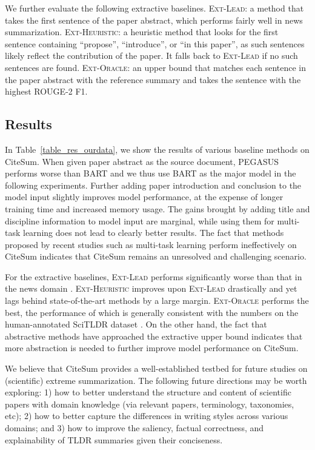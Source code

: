 \documentclass[11pt]{article}
\newcommand{\ourdata}{CiteSum\xspace}
\begin{document}
We further evaluate the following extractive baselines.
\textsc{Ext-Lead}: a method that takes the first sentence of the paper abstract, which performs fairly well in news summarization.
\textsc{Ext-Heuristic}: a heuristic method that looks for the first sentence containing ``propose'', ``introduce'', or ``in this paper'', as such sentences likely reflect the contribution of the paper. It falls back to \textsc{Ext-Lead} if no such sentences are found.
\textsc{Ext-Oracle}: an upper bound that matches each sentence in the paper abstract with the reference summary and takes the sentence with the highest ROUGE-2 F1.

\subsection{Results}
In Table~\ref{table_res_ourdata}, we show the results of various baseline methods on \ourdata.
When given paper abstract as the source document, PEGASUS performs worse than BART and we thus use BART as the major model in the following experiments.
Further adding paper introduction and conclusion to the model input slightly improves model performance, at the expense of longer training time and increased memory usage.
The gains brought by adding title and discipline information to model input are marginal, while using them for multi-task learning does not lead to clearly better results. The fact that methods proposed by recent studies such as multi-task learning \cite{cachola-etal-2020-tldr} perform ineffectively on \ourdata indicates that \ourdata remains an unresolved and challenging scenario. 

For the extractive baselines, \textsc{Ext-Lead} performs significantly worse than that in the news domain \cite{mao-etal-2020-facet}. \textsc{Ext-Heuristic} improves upon \textsc{Ext-Lead} drastically and yet lags behind state-of-the-art methods by a large margin.
\textsc{Ext-Oracle} performs the best, the performance of which is generally consistent with the numbers on the human-annotated SciTLDR dataset \cite{cachola-etal-2020-tldr}.
On the other hand, the fact that abstractive methods have approached the extractive upper bound indicates that more abstraction is needed to further improve model performance on \ourdata. 

We believe that \ourdata provides a well-established testbed for future studies on (scientific) extreme summarization.
The following future directions may be worth exploring: 1) how to better understand the structure and content of scientific papers with domain knowledge (via relevant papers, terminology, taxonomies, etc); 2) how to better capture the differences in writing styles across various domains; and 3) how to improve the saliency, factual correctness, and explainability of TLDR summaries given their conciseness.
\end{document}
